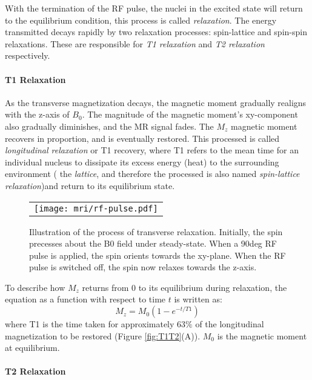 With the termination of the RF pulse, the nuclei in the excited state will return to the equilibrium condition, this process is called \textit{relaxation}. 
The energy transmitted decays rapidly by two relaxation processes:  spin-lattice and spin-spin relaxations. These are responsible for \textit{T1 relaxation} and \textit{T2 relaxation} respectively. 

\paragraph{T1 Relaxation} 
As the transverse magnetization decays, the magnetic moment gradually realigns with the z-axis of $B_0$. 
The magnitude of the magnetic moment's xy-component also gradually diminishes, and the MR signal fades. 
The $M_z$ magnetic moment recovers in proportion, and is eventually restored. 
This processed is called \textit{longitudinal relaxation} or T1 recovery, where T1 refers to the mean time for an individual nucleus to
dissipate its excess energy (heat) to the surrounding environment ( the \textit{lattice}, and therefore the processed is also named \textit{spin-lattice relaxation})and return to its equilibrium state. 

\begin{figure}[htb]
\begin{center}
\begin{tabular}{c}
\texttt{[image: mri/rf-pulse.pdf]}
\end{tabular}
\caption{Illustration of the process of transverse relaxation. Initially, the spin precesses about the B0 field under steady-state. When a 90deg RF pulse is applied, the spin orients towards the xy-plane. When the RF pulse is switched off, the spin now relaxes towards the z-axis.  } \label{fig:energy}
\end{center}
\end{figure}

To describe how $M_z$ returns from 0 to its equilibrium during relaxation, the equation as a
function with respect to time $t$ is written as: 
$$M_z = M_0 (1 - e^{-t/T1})$$
where T1 is the time taken for approximately 63$\%$ of the longitudinal magnetization to be restored (Figure \ref{fig:T1T2}(A)). 
$M_0$ is the magnetic moment at equilibrium. 

\paragraph{T2 Relaxation}

